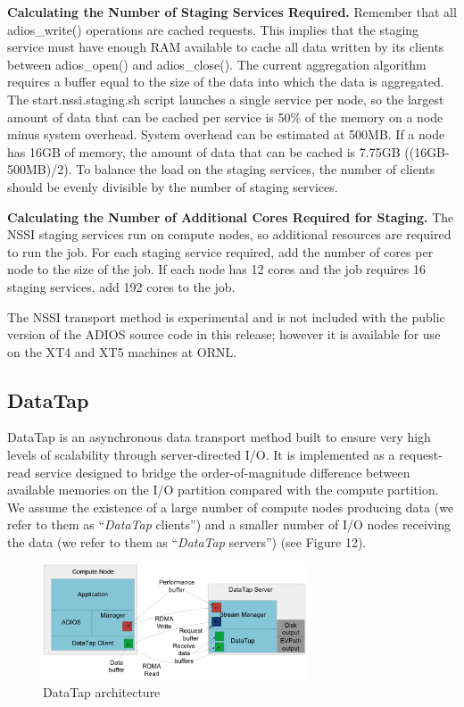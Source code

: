 \textbf{Calculating the Number of Staging Services Required.}  Remember that all 
adios\_write() operations are cached requests.  This implies that the staging service 
must have enough RAM available to cache all data written by its clients between 
adios\_open() and adios\_close().  The current aggregation algorithm requires a 
buffer equal to the size of the data into which the data is aggregated.  The start.nssi.staging.sh 
script launches a single service per node, so the largest amount of data that can 
be cached per service is 50\% of the memory on a node minus system overhead.  System 
overhead can be estimated at 500MB.  If a node has 16GB of memory, the amount of 
data that can be cached is 7.75GB ((16GB-500MB)/2).  To balance the load on the 
staging services, the number of clients should be evenly divisible by the number 
of staging services.

\textbf{Calculating the Number of Additional Cores Required for Staging.}  The 
NSSI staging services run on compute nodes, so additional resources are required 
to run the job.  For each staging service required, add the number of cores per 
node to the size of the job.  If each node has 12 cores and the job requires 16 
staging services, add 192 cores to the job.

The NSSI transport method is experimental and is not included with the public version 
of the ADIOS source code in this release; however it is available for use on the 
XT4 and XT5 machines at ORNL.\label{HToc84890266}\label{HToc212016642}\label{HToc212016884}\label{HToc182553391}

\subsection{DataTap}

DataTap is an asynchronous data transport method built to ensure very high levels 
of scalability through server-directed I/O. It is implemented as a request-read 
service designed to bridge the order-of-magnitude difference between available 
memories on the I/O partition compared with the compute partition. We assume the 
existence of a large number of compute nodes producing data (we refer to them as 
``\textit{DataTap }clients'') and a smaller number of I/O nodes receiving the data 
(we refer to them as ``\textit{DataTap }servers'') (see Figure 12). 

\begin{figure}[htbp]
\begin{center}
\includegraphics[width=222pt, height=97pt]{ADIOS-Manual-fig022.png}
\caption{DataTap architecture}
\end{center}
\end{figure}\label{HRef119578596}\label{HToc144350171}


